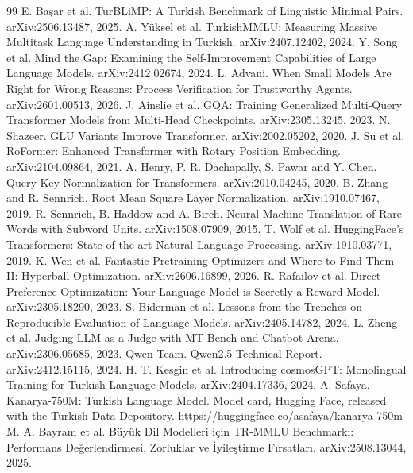 \documentclass[11pt]{article}
\begin{document}
\begin{thebibliography}{99}
 E. Başar et al. TurBLiMP: A Turkish Benchmark of Linguistic Minimal Pairs. arXiv:2506.13487, 2025.
 A. Yüksel et al. TurkishMMLU: Measuring Massive Multitask Language Understanding in Turkish. arXiv:2407.12402, 2024.
 Y. Song et al. Mind the Gap: Examining the Self-Improvement Capabilities of Large Language Models. arXiv:2412.02674, 2024.
 L. Advani. When Small Models Are Right for Wrong Reasons: Process Verification for Trustworthy Agents. arXiv:2601.00513, 2026.
 J. Ainslie et al. GQA: Training Generalized Multi-Query Transformer Models from Multi-Head Checkpoints. arXiv:2305.13245, 2023.
 N. Shazeer. GLU Variants Improve Transformer. arXiv:2002.05202, 2020.
 J. Su et al. RoFormer: Enhanced Transformer with Rotary Position Embedding. arXiv:2104.09864, 2021.
 A. Henry, P. R. Dachapally, S. Pawar and Y. Chen. Query-Key Normalization for Transformers. arXiv:2010.04245, 2020.
 B. Zhang and R. Sennrich. Root Mean Square Layer Normalization. arXiv:1910.07467, 2019.
 R. Sennrich, B. Haddow and A. Birch. Neural Machine Translation of Rare Words with Subword Units. arXiv:1508.07909, 2015.
 T. Wolf et al. HuggingFace's Transformers: State-of-the-art Natural Language Processing. arXiv:1910.03771, 2019.
 K. Wen et al. Fantastic Pretraining Optimizers and Where to Find Them II: Hyperball Optimization. arXiv:2606.16899, 2026.
 R. Rafailov et al. Direct Preference Optimization: Your Language Model is Secretly a Reward Model. arXiv:2305.18290, 2023.
 S. Biderman et al. Lessons from the Trenches on Reproducible Evaluation of Language Models. arXiv:2405.14782, 2024.
 L. Zheng et al. Judging LLM-as-a-Judge with MT-Bench and Chatbot Arena. arXiv:2306.05685, 2023.
 Qwen Team. Qwen2.5 Technical Report. arXiv:2412.15115, 2024.
 H. T. Kesgin et al. Introducing cosmosGPT: Monolingual Training for Turkish Language Models. arXiv:2404.17336, 2024.
 A. Safaya. Kanarya-750M: Turkish Language Model. Model card, Hugging Face, released with the Turkish Data Depository. \url{https://huggingface.co/asafaya/kanarya-750m}
 M. A. Bayram et al. B\"{u}y\"{u}k Dil Modelleri i\c{c}in TR-MMLU Benchmark{\i}: Performans De\u{g}erlendirmesi, Zorluklar ve \.{I}yile\c{s}tirme F{\i}rsatlar{\i}. arXiv:2508.13044, 2025.
\end{thebibliography}
\end{document}
